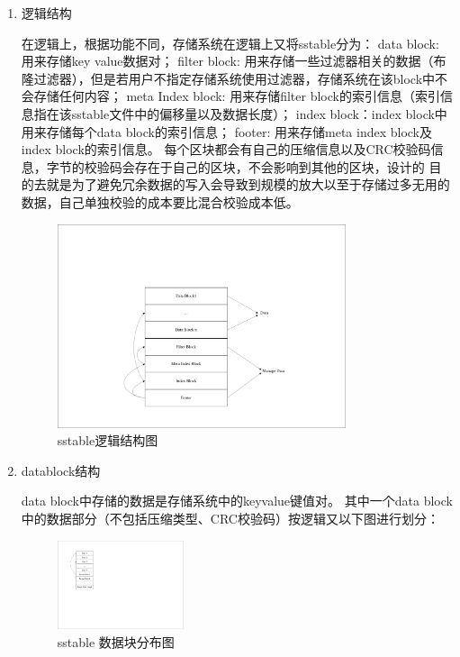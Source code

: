 \begin{enumerate}
\begin{enumerate}
					\item 逻辑结构
	
					在逻辑上，根据功能不同，存储系统在逻辑上又将sstable分为：
	data block: 用来存储key value数据对；
	filter block: 用来存储一些过滤器相关的数据（布隆过滤器），但是若用户不指定存储系统使用过滤器，存储系统在该block中不会存储任何内容；
	meta Index block: 用来存储filter block的索引信息（索引信息指在该sstable文件中的偏移量以及数据长度）；
	index block：index block中用来存储每个data block的索引信息；
	footer: 用来存储meta index block及index block的索引信息。
	每个区块都会有自己的压缩信息以及CRC校验码信息，字节的校验码会存在于自己的区块，不会影响到其他的区块，设计的
	目的去就是为了避免冗余数据的写入会导致到规模的放大以至于存储过多无用的数据，自己单独校验的成本要比混合校验成本低。
	\begin{figure}[H]
		\centering
		\includegraphics[width=0.80\textwidth]{pdf/sstable_logic.pdf}
		\caption{sstable逻辑结构图}
		\label{sstable_logic}
	\end{figure}
	
				
	
					\item datablock结构
	
					data block中存储的数据是存储系统中的keyvalue键值对。
					其中一个data block中的数据部分（不包括压缩类型、CRC校验码）按逻辑又以下图进行划分：
					
					\begin{figure}[H]
						\centering
						\includegraphics[width=0.35\textwidth]{pdf/datablock.pdf}
						\caption{sstable 数据块分布图}
						\label{sstable_data_block}
					\end{figure}
					

\end{enumerate}
\end{enumerate}
